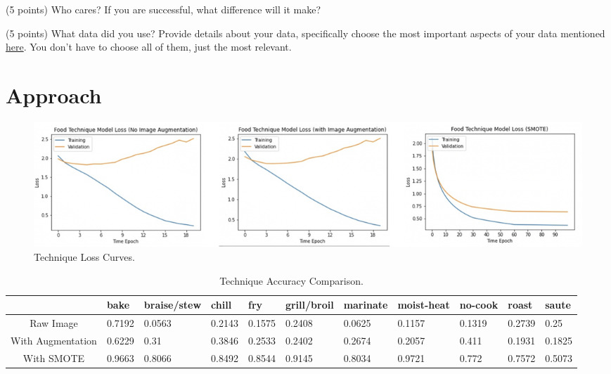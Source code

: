 \documentclass[10pt,twocolumn,letterpaper]{article}
\begin{document}
(5 points) Who cares? If you are successful, what difference will it make? 

(5 points) What data did you use? Provide details about your data, specifically choose the most important aspects of your data mentioned \href{https://arxiv.org/abs/1803.09010}{here}. You don’t have to choose all of them, just the most relevant.

\section{Approach}
\begin{figure}
\begin{center}
\includegraphics[width=1.0\linewidth]{technique_model_loss_curve}
\end{center}
  \caption{Technique Loss Curves.}
\label{fig:loss_curve}
\end{figure}

\begin{table}
\begin{center}
\begin{tabular}{|c|l|l|l|l|l|l|l|l|l|l|}
\hline
 & bake & braise/stew & chill & fry & grill/broil & marinate & moist-heat & no-cook & roast & saute \\
\hline\hline
Raw Image & 0.7192 & 0.0563 & 0.2143 & 0.1575 & 0.2408 & 0.0625 & 0.1157 & 0.1319 & 0.2739 & 0.25 \\
With Augmentation & 0.6229 & 0.31 & 0.3846 & 0.2533 & 0.2402 & 0.2674 & 0.2057 & 0.411 & 0.1931 & 0.1825 \\
With SMOTE & 0.9663 & 0.8066 & 0.8492 & 0.8544 & 0.9145 & 0.8034 & 0.9721 & 0.772 & 0.7572 & 0.5073 \\
\hline
\end{tabular}
\end{center}
\caption{Technique Accuracy Comparison.}
\label{tab:accuracy}
\end{table}
\end{document}

